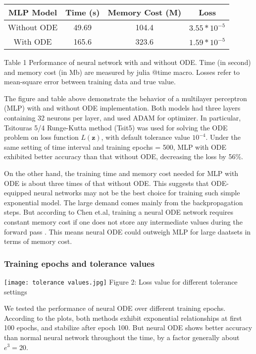 \documentclass{article}
\begin{document}
\begin{center}

\begin{tabular}{c|c|c|c}
    \hline
   MLP Model  & Time (s) & Memory Cost (M) & Loss \\
   \hline
   Without ODE	& 49.69	& 104.4	& $3.55*10^{-5}$ \\
    \hline
    With ODE & 165.6 &	323.6 &	$1.59*10^{-5}$ \\
    \hline
\end{tabular}

Table 1 Performance of neural network with and without ODE. Time (in second) and memory cost (in Mb) are measured by julia @time macro. Losses refer to mean-square error between training data and true value.
\end{center}


The figure and table above demonstrate the behavior of a multilayer perceptron (MLP) with and without ODE implementation. Both models had three layers containing 32 neurons per layer, and used ADAM for optimizer. In particular, Tsitouras 5/4 Runge-Kutta method (Tsit5) was used for solving the ODE problem on loss function $L(\mathbf{z})$, with default tolerance value $10^{-4}$. Under the same setting of time interval and training epochs = 500, MLP with ODE exhibited better accuracy than that without ODE, decreasing the loss by 56\%.

On the other hand, the training time and memory cost needed for MLP with ODE is about three times of that without ODE. This suggests that ODE-equipped neural networks may not be the best choice for training such simple exponential model. The large demand comes mainly from the backpropagation steps. But according to Chen et.al, training a neural ODE network requires constant memory cost if one does not store any intermediate values during the forward pass \cite{chen2019neural}. This means neural ODE could outweigh MLP for large daatsets in terms of memory cost.


\subsubsection{Training epochs and tolerance values}

\begin{center}
    \texttt{[image: tolerance values.jpg]}
    Figure 2: Loss value for different tolerance settings
\end{center}
     
We tested the performance of neural ODE over different training epochs. According to the plots, both methods exhibit exponential relationships at first 100 epochs, and stabilize after epoch 100. But neural ODE shows better accuracy than normal neural network throughout the time, by a factor generally about $e^3 = 20$.
\end{document}
